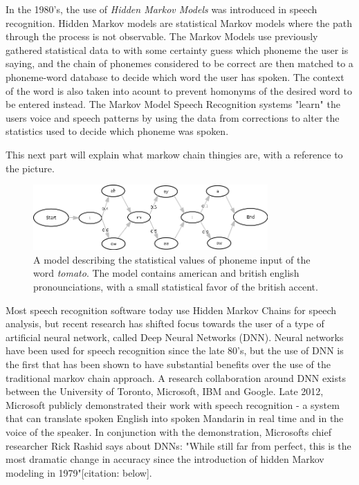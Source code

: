 In the 1980's, the use of \emph{Hidden Markov Models} was introduced in speech recognition\cite{rabiner1986introduction}. Hidden Markov models are statistical Markov models where the path through the process is not observable. The Markov Models use previously gathered statistical data to with some certainty guess which phoneme the user is saying, and the chain of phonemes considered to be correct are then matched to a phoneme-word database to decide which word the user has spoken. The context of the word is also taken into acount to prevent homonyms of the desired word to be entered instead. The Markov Model Speech Recognition systems "learn" the users voice and speech patterns by using the data from corrections to alter the statistics used to decide which phoneme was spoken. 

This next part will explain what markow chain thingies are, with a reference to the picture.

\begin{figure}[]
\includegraphics[width=0.8\textwidth] {bilder/tomato.jpg}
\caption{A model describing the statistical values of phoneme input of the word \emph{tomato}. The model contains american and british english pronounciations, with a small statistical favor of the british accent.}
\label{ibooks}
\end{figure}

Most speech recognition software today use Hidden Markov Chains for speech analysis\cite{DNN}, but recent research has shifted focus towards the user of a type of artificial neural network, called Deep Neural Networks (DNN). Neural networks have been used for speech recognition since the late 80's, but the use of DNN is the first that has been shown to have substantial benefits over the use of the traditional markov chain approach. A research collaboration around DNN exists between the University of Toronto, Microsoft, IBM and Google. Late 2012, Microsoft publicly demonstrated their work with speech recognition - a system that can translate spoken English into spoken Mandarin in real time and in the voice of the speaker. In conjunction with the demonstration, Microsofts chief researcher Rick Rashid says about DNNs: "While still far from perfect, this is the most dramatic change in accuracy since the introduction of hidden Markov modeling in 1979"[citation: below].

